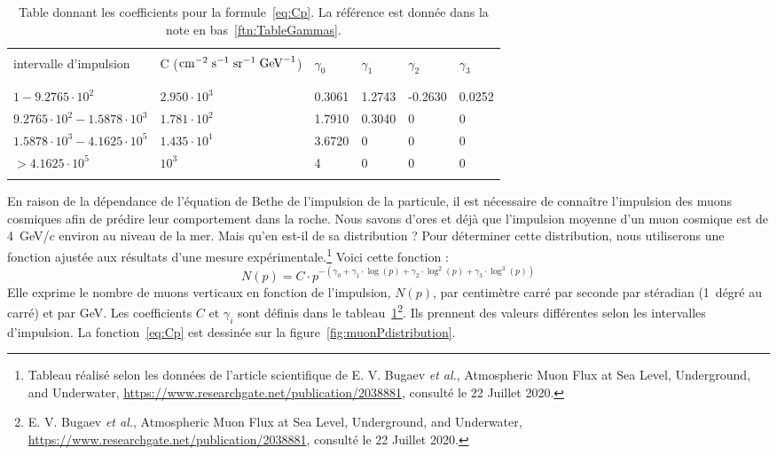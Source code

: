 \documentclass[a4paper, 12pt]{article}
\begin{document}
\begin{spacing}{1.5}
\begin{table}[t]
\begin{center}
\begin{tabular}{llllll}
\hline\hline
&&&\\[0.005cm]
intervalle d'impulsion & C ($\rm{cm}^{-2}\;\rm{s}^{-1}\;\rm{sr}^{-1}\;\rm{GeV}^{-1}$) & $\gamma_0$ & $\gamma_1$ & $\gamma_2$ & $\gamma_3$ \\
&&&\\[0.005cm]
\hline
&&&\\[0.005cm]
$1 - 9.2765\cdot10^2$ & $2.950\cdot10^3$ & 0.3061 & 1.2743 & -0.2630 & 0.0252 \\ [0.3cm]
$9.2765\cdot10^2 - 1.5878\cdot10^3$ & $1.781\cdot10^2$ & 1.7910 & 0.3040 & 0 & 0 \\ [0.3cm]
$1.5878\cdot10^3 - 4.1625\cdot10^5$ & $1.435\cdot10^1$ & 3.6720 & 0 & 0 & 0 \\ [0.3cm]
$>4.1625\cdot10^5$ & $10^3$ & 4 & 0 & 0 & 0 \\
&&&\\[0.005cm]
\hline\hline
\end{tabular}
\end{center}
\caption{\label{tab:TableGammas} Table donnant les coefficients pour la formule~\ref{eq:Cp}. La référence est donnée dans la note en bas~\ref{ftn:TableGammas}.}
\end{table}
En raison de la dépendance de l'équation de Bethe de l'impulsion de la particule, il est nécessaire de connaître l'impulsion des muons cosmiques afin de prédire leur comportement dans la roche. Nous savons d'ores et déjà que l'impulsion moyenne d'un muon cosmique est de 4~GeV/$c$ environ au niveau de la mer. Mais qu'en est-il de sa distribution ? Pour déterminer cette distribution, nous utiliserons une fonction ajustée aux résultats d'une mesure expérimentale.\footnote{Tableau réalisé selon les données de l'article scientifique de E. V. Bugaev \emph{et al.}, Atmospheric Muon Flux at Sea Level, Underground, and Underwater, \url{https://www.researchgate.net/publication/2038881}, consulté le 22 Juillet 2020.} Voici cette fonction :
\begin{equation}
N(p) = C\cdot p^{- (\gamma_0 + \gamma_1\cdot\log(p) + \gamma_2\cdot\log^2(p) + \gamma_3\cdot\log^3(p))} \label{eq:Cp}
\end{equation}
Elle exprime le nombre de muons verticaux en fonction de l'impulsion, $N(p)$, par centimètre carré par seconde par stéradian (1~dégré au carré) et par GeV. Les coefficients $C$ et $\gamma_i$ sont définis dans le tableau~\ref{tab:TableGammas}\footnote{E. V. Bugaev \emph{et al.}, Atmospheric Muon Flux at Sea Level, Underground, and Underwater, \url{https://www.researchgate.net/publication/2038881}, consulté le 22 Juillet 2020.}. Ils prennent des valeurs différentes selon les intervalles d'impulsion. La fonction~\ref{eq:Cp} est dessinée sur la figure~\ref{fig:muonPdistribution}. 

\end{spacing}
\end{document}
